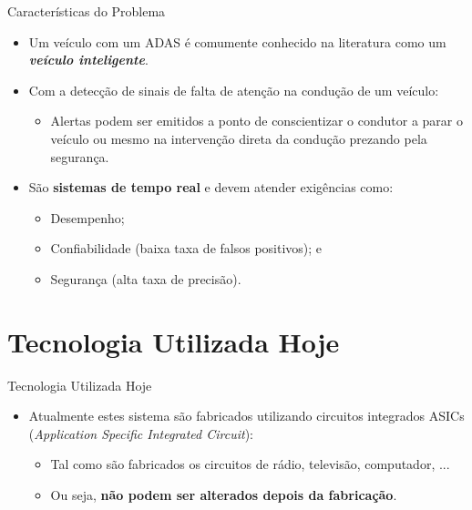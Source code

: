 \documentclass[aspectratio=169]{beamer}
\begin{document}
\begin{frame}{Características do Problema}
	\begin{itemize}
		\item Um veículo com um ADAS é comumente conhecido na literatura como um \textbf{\textit{veículo inteligente}}.
		\item Com a detecção de sinais de falta de atenção na condução de um veículo:
		\begin{itemize}
			\item Alertas podem ser emitidos a ponto de conscientizar o condutor a parar o veículo ou mesmo na intervenção direta da condução prezando pela segurança.
		\end{itemize}
		
			\bigskip
		
		 \item São \textbf{sistemas de tempo real} e devem atender exigências como:
		 \begin{itemize}
		 	\item Desempenho;
		 	\item Confiabilidade (baixa taxa de falsos positivos);  e 
		 	\item Segurança (alta taxa de precisão).
		 \end{itemize}
	\end{itemize}
\end{frame}



\section{Tecnologia Utilizada Hoje}

\begin{frame}{Tecnologia Utilizada Hoje}
	\begin{itemize}
		\item Atualmente estes sistema são fabricados utilizando circuitos integrados ASICs (\textit{Application Specific Integrated Circuit}):
		
			\bigskip
			
		\begin{itemize}
			\item Tal como são fabricados os circuitos de rádio, televisão, computador, ... \pause
			
				\bigskip
			
			\item Ou seja, \textbf{não podem ser alterados depois da fabricação}.
		\end{itemize}
	\end{itemize}
\end{frame}
\end{document}
